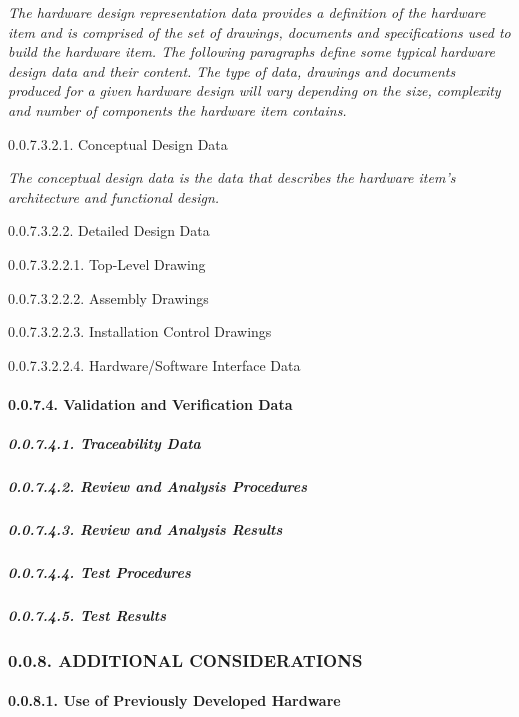 \documentclass[
]{article}
\begin{document}
\emph{The hardware design representation data provides a definition of
the hardware item and is comprised of the set of drawings, documents and
specifications used to build the hardware item. The following paragraphs
define some typical hardware design data and their content. The type of
data, drawings and documents produced for a given hardware design will
vary depending on the size, complexity and number of components the
hardware item contains.}

0.0.7.3.2.1. Conceptual Design Data

\emph{The conceptual design data is the data that describes the hardware
item's architecture and functional design.}

0.0.7.3.2.2. Detailed Design Data

0.0.7.3.2.2.1. Top-Level Drawing

0.0.7.3.2.2.2. Assembly Drawings

0.0.7.3.2.2.3. Installation Control Drawings

0.0.7.3.2.2.4. Hardware/Software Interface Data

\hypertarget{validation-and-verification-data}{%
\paragraph{0.0.7.4. Validation and Verification
Data}\label{validation-and-verification-data}}

\hypertarget{traceability-data}{%
\subparagraph{0.0.7.4.1. Traceability Data}\label{traceability-data}}

\hypertarget{review-and-analysis-procedures}{%
\subparagraph{0.0.7.4.2. Review and Analysis
Procedures}\label{review-and-analysis-procedures}}

\hypertarget{review-and-analysis-results}{%
\subparagraph{0.0.7.4.3. Review and Analysis
Results}\label{review-and-analysis-results}}

\hypertarget{test-procedures}{%
\subparagraph{0.0.7.4.4. Test Procedures}\label{test-procedures}}

\hypertarget{test-results}{%
\subparagraph{0.0.7.4.5. Test Results}\label{test-results}}

\hypertarget{additional-considerations}{%
\subsubsection{0.0.8. ADDITIONAL
CONSIDERATIONS}\label{additional-considerations}}

\hypertarget{use-of-previously-developed-hardware}{%
\paragraph{0.0.8.1. Use of Previously Developed
Hardware}\label{use-of-previously-developed-hardware}}
\end{document}
